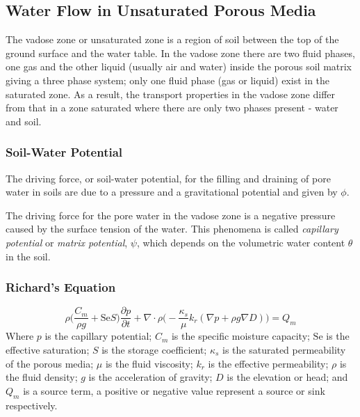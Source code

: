 
\subsection{Water Flow in Unsaturated Porous Media}\label{sec:richards}

The vadose zone or unsaturated zone is a region of soil between the top of the ground surface and the water table.
In the vadose zone there are two fluid phases, one gas and the other liquid (usually air and water) inside the porous soil matrix giving a three phase system; only one fluid phase (gas or liquid) exist in the saturated zone.
As a result, the transport properties in the vadose zone differ from that in a zone saturated where there are only two phases present - water and soil.\par



\subsubsection{Soil-Water Potential}

The driving force, or soil-water potential, for the filling and draining of pore water in soils are due to a pressure and a gravitational potential and given by $\phi$.


The driving force for the pore water in the vadose zone is a negative pressure caused by the surface tension of the water.
This phenomena is called \textit{capillary potential} or \textit{matrix potential}, $\psi$, which depends on the volumetric water content $\theta$ in the soil.




\subsubsection{Richard's Equation}

\begin{equation}\label{eq:richards}
  \rho \Big( \frac{C_m}{\rho g} + \mathrm{Se}S \Big) \frac{\partial p}{\partial t} +
  \nabla \cdot \rho \Big( -\frac{\kappa_s}{\mu} k_r (\nabla p + \rho g \nabla D)\Big) =
  Q_m
\end{equation}
Where $p$ is the capillary potential; $C_m$ is the specific moisture capacity; $\mathrm{Se}$ is the effective saturation; $S$ is the storage coefficient; $\kappa_s$ is the saturated permeability of the porous media; $\mu$ is the fluid viscosity; $k_r$ is the effective permeability; $\rho$ is the fluid density; $g$ is the acceleration of gravity; $D$ is the elevation or head; and $Q_m$ is a source term, a positive or negative value represent a source or sink respectively.\par
